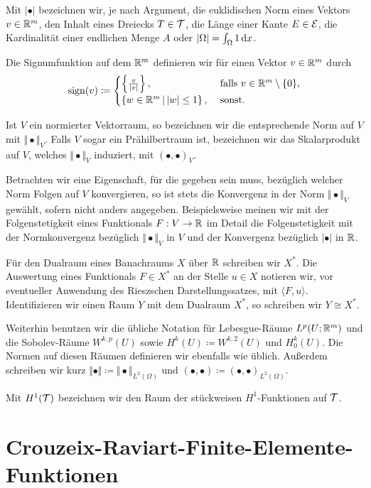 Mit $|\bullet|$ bezeichnen wir, je nach Argument, die euklidischen Norm eines
Vektors $v\in\mathbb{R}^m$, den Inhalt eines Dreiecks $T\in\mathcal{T}$, die Länge
einer Kante $E\in\mathcal{E}$, die Kardinalität einer endlichen Menge $A$
oder $|\Omega|=\int_\Omega 1\,\mathrm{d}x$.

Die Signumfunktion auf dem $\mathbb{R}^m$ definieren wir für einen Vektor
$v\in\mathbb{R}^m$ durch
\begin{align*}
  \operatorname{sign}(v)\coloneqq
  \begin{cases}
    \left\{\frac{v}{|v|}\right\},&\text{ falls }v\in\mathbb{R}^m\setminus\{0\},\\
    \left\{w\in\mathbb{R}^m\,\middle|\,|w|\leq 1\right\},&\text{ sonst.}
  \end{cases}
\end{align*}

Ist $V$ ein normierter Vektorraum, so bezeichnen wir die entsprechende Norm auf
$V$ mit $\Vert\bullet\Vert_V$. 
Falls $V$ sogar ein Prähilbertraum ist, bezeichnen wir das Skalarprodukt auf
$V$, welches $\Vert\bullet\Vert_V$ induziert, mit $(\bullet,\bullet)_V$.

Betrachten wir eine Eigenschaft, für die gegeben sein muss, bezüglich welcher
Norm Folgen auf $V$ konvergieren, so ist stets die Konvergenz in der Norm
$\Vert\bullet\Vert_V$ gewählt, sofern nicht anders angegeben.
Beispielsweise meinen wir mit der Folgenstetigkeit eines Funktionals
$F:V\to\mathbb{R}$ im Detail die Folgenstetigkeit mit der Normkonvergenz
bezüglich $\Vert\bullet\Vert_V$ in $V$ und der Konvergenz bezüglich $|\bullet|$
in $\mathbb{R}$.

Für den Dualraum eines Banachraums $X$ über $\mathbb{R}$ 
schreiben wir $X^\ast$. Die Auswertung eines Funktionals $F\in X^\ast$ an
der Stelle $u\in X$ notieren wir, vor eventueller 
Anwendung des Rieszschen Darstellungssatzes, mit $\langle F,u\rangle$.
Identifizieren wir einen Raum $Y$ mit dem Dualraum $X^\ast$, so schreiben
wir $Y\cong X^\ast$.

Weiterhin benutzen wir die übliche Notation für Lebesgue-Räume
$L^p\!\left(U;\mathbb{R}^m\right)$ und die So\-bo\-lev-Räume $W^{k,p}(U)$ sowie
$H^k(U)\coloneqq W^{k,2}(U)$ und $H^k_0(U)$. Die Normen auf diesen Räumen
definieren wir ebenfalls wie üblich.
Außerdem schreiben wir kurz $\Vert\bullet\Vert \coloneqq
\Vert\bullet\Vert_{L^2(\Omega)}$
und $(\bullet,\bullet)\coloneqq(\bullet,\bullet)_{L^2(\Omega)}$.

Mit $H^1(\mathcal{T})$ bezeichnen wir den Raum der stückweisen $H^1$-Funktionen auf
$\mathcal{T}$.


\section{Crouzeix-Raviart-Finite-Elemente-Funktionen}
\label{sec:crouzeixRaviartFunctions}


